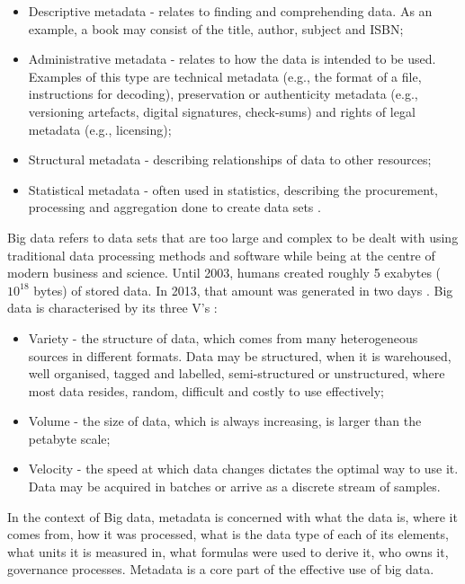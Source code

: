 \begin{itemize}
    \item Descriptive metadata - relates to finding and comprehending data. As an example, a book may consist of the title, author, subject and ISBN;
    \item Administrative metadata - relates to how the data is intended to be used. Examples of this type are technical metadata (e.g., the format of a file, instructions for decoding), preservation or authenticity metadata (e.g., versioning artefacts, digital signatures, check-sums) and rights of legal metadata (e.g., licensing);
    \item Structural metadata - describing relationships of data to other resources;
    \item Statistical metadata - often used in statistics, describing the procurement, processing and aggregation done to create data sets \cite{roleOfMetadataInStatisticsdippo2000}. 
\end{itemize}

Big data refers to data sets that are too large and complex to be dealt with using traditional data processing methods and software while being at the centre of modern business and science. Until 2003, humans created roughly 5 exabytes ($10^{18}$ bytes) of stored data. In 2013, that amount was generated in two days \cite{bigDataAReviewsagiroglu2013}. Big data is characterised by its three V's \cite{understandingBigDataZikopoulos2011}:

\begin{itemize}
    \item Variety - the structure of data, which comes from many heterogeneous sources in different formats. Data may be structured, when it is warehoused, well organised, tagged and labelled, semi-structured or unstructured, where most data resides, random, difficult and costly to use effectively;
    \item Volume - the size of data, which is always increasing, is larger than the petabyte scale;
    \item Velocity - the speed at which data changes dictates the optimal way to use it. Data may be acquired in batches or arrive as a discrete stream of samples.
\end{itemize}

In the context of Big data, metadata is concerned with what the data is, where it comes from, how it was processed, what is the data type of each of its elements, what units it is measured in, what formulas were used to derive it, who owns it, governance processes. Metadata is a core part of the effective use of big data.

